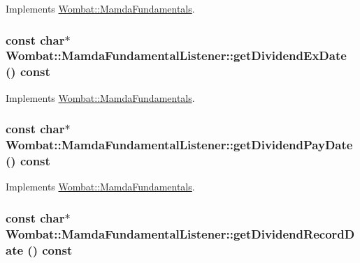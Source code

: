 Implements \hyperlink{classWombat_1_1MamdaFundamentals_f66bec2553735a9615e2c8c9a42946ce}{Wombat::Mamda\-Fundamentals}.\hypertarget{classWombat_1_1MamdaFundamentalListener_063a6648c273949792d6ebdf740ce956}{
\subsubsection[getDividendExDate]{\setlength{\rightskip}{0pt plus 5cm}const char$\ast$ Wombat::Mamda\-Fundamental\-Listener::get\-Dividend\-Ex\-Date () const}}
\label{classWombat_1_1MamdaFundamentalListener_063a6648c273949792d6ebdf740ce956}




Implements \hyperlink{classWombat_1_1MamdaFundamentals_236eb051f36fd73186ed6f19ffd6d4b9}{Wombat::Mamda\-Fundamentals}.\hypertarget{classWombat_1_1MamdaFundamentalListener_4f4c19ac596754914a59a2389eeac5bc}{
\subsubsection[getDividendPayDate]{\setlength{\rightskip}{0pt plus 5cm}const char$\ast$ Wombat::Mamda\-Fundamental\-Listener::get\-Dividend\-Pay\-Date () const}}
\label{classWombat_1_1MamdaFundamentalListener_4f4c19ac596754914a59a2389eeac5bc}




Implements \hyperlink{classWombat_1_1MamdaFundamentals_897da92a45e76b87d54f6196a99b2c7e}{Wombat::Mamda\-Fundamentals}.\hypertarget{classWombat_1_1MamdaFundamentalListener_da3a7f2c8e3800e187af0198f8a6ab1c}{
\subsubsection[getDividendRecordDate]{\setlength{\rightskip}{0pt plus 5cm}const char$\ast$ Wombat::Mamda\-Fundamental\-Listener::get\-Dividend\-Record\-Date () const}}
\label{classWombat_1_1MamdaFundamentalListener_da3a7f2c8e3800e187af0198f8a6ab1c}




